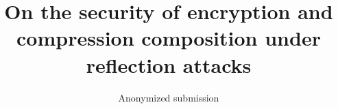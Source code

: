 \documentclass[letterpaper,twocolumn,10pt]{article}
\begin{document}
\title{On the security of encryption and compression composition under reflection attacks}

\author{
    Anonymized submission
}

\maketitle

\thispagestyle{empty}
















\end{document}
